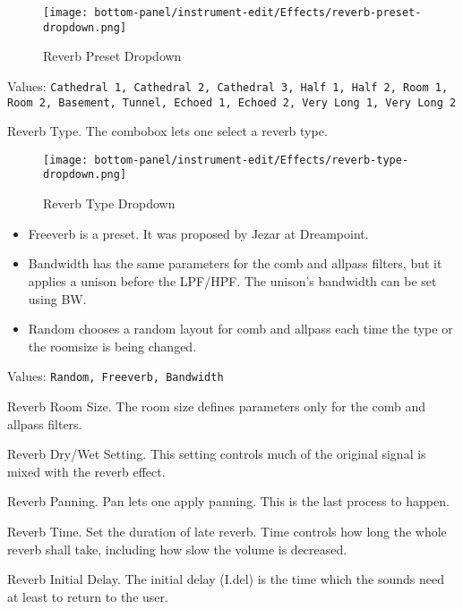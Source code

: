 \begin{figure}[H]
   \centering
   \texttt{[image: bottom-panel/instrument-edit/Effects/reverb-preset-dropdown.png]}
   \caption{Reverb Preset Dropdown}
   \label{fig:reverb_preset_dropdown}
\end{figure}

   Values: \texttt{Cathedral 1, Cathedral 2, Cathedral 3, Half 1, Half 2,
              Room 1, Room 2, Basement, Tunnel, Echoed 1, Echoed 2, Very Long
               1, Very Long 2}

   Reverb Type.
   The combobox lets one select a reverb type.

\begin{figure}[H]
   \centering
   \texttt{[image: bottom-panel/instrument-edit/Effects/reverb-type-dropdown.png]}
   \caption{Reverb Type Dropdown}
   \label{fig:reverb_type_dropdown}
\end{figure}

   \begin{itemize}
      \item Freeverb is a preset. It was proposed by Jezar at Dreampoint.
      \item Bandwidth has the same parameters for the comb and allpass
         filters, but it applies a unison before the LPF/HPF. The unison’s
         bandwidth can be set using BW.
      \item Random chooses a random layout for comb and allpass each time the
         type or the roomsize is being changed.
   \end{itemize}

   Values: \texttt{Random, Freeverb, Bandwidth}

   Reverb Room Size.
   The room size defines parameters only for the comb and allpass filters.

   Reverb Dry/Wet Setting.
   This setting controls much of the original signal is mixed with the
   reverb effect.

   Reverb Panning.
   Pan lets one apply panning. This is the last process to happen.

   Reverb Time.
   Set the duration of late reverb.
   Time controls how long the whole reverb shall take, including how slow
   the volume is decreased.

   Reverb Initial Delay.
   The initial delay (I.del) is the time which the sounds need at least to
   return to the user.

